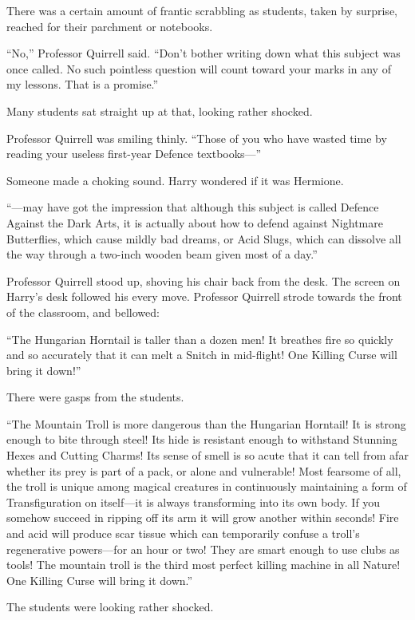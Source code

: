 There was a certain amount of frantic scrabbling as students, taken by surprise, reached for their parchment or notebooks.

“No,” Professor Quirrell said. “Don’t bother writing down what this subject was once called. No such pointless question will count toward your marks in any of my lessons. That is a promise.”

Many students sat straight up at that, looking rather shocked.

Professor Quirrell was smiling thinly. “Those of you who have wasted time by reading your useless first-year Defence textbooks—”

Someone made a choking sound. Harry wondered if it was Hermione.

“—may have got the impression that although this subject is called Defence Against the Dark Arts, it is actually about how to defend against Nightmare Butterflies, which cause mildly bad dreams, or Acid Slugs, which can dissolve all the way through a two-inch wooden beam given most of a day.”

Professor Quirrell stood up, shoving his chair back from the desk. The screen on Harry’s desk followed his every move. Professor Quirrell strode towards the front of the classroom, and bellowed:

“The Hungarian Horntail is taller than a dozen men! It breathes fire so quickly and so accurately that it can melt a Snitch in mid-flight! One Killing Curse will bring it down!”

There were gasps from the students.

“The Mountain Troll is more dangerous than the Hungarian Horntail! It is strong enough to bite through steel! Its hide is resistant enough to withstand Stunning Hexes and Cutting Charms! Its sense of smell is so acute that it can tell from afar whether its prey is part of a pack, or alone and vulnerable! Most fearsome of all, the troll is unique among magical creatures in continuously maintaining a form of Transfiguration on itself—it is always transforming into its own body. If you somehow succeed in ripping off its arm it will grow another within seconds! Fire and acid will produce scar tissue which can temporarily confuse a troll’s regenerative powers—for an hour or two! They are smart enough to use clubs as tools! The mountain troll is the third most perfect killing machine in all Nature! One Killing Curse will bring it down.”

The students were looking rather shocked.

